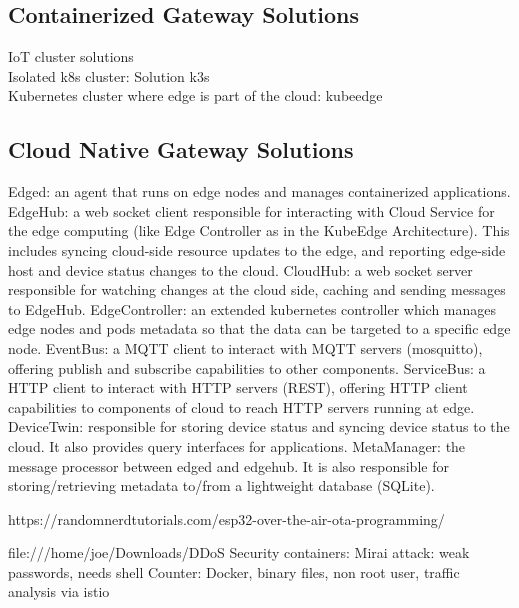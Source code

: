 \subsection{Containerized Gateway Solutions}

IoT cluster solutions\\
Isolated k8s cluster: Solution k3s\\
Kubernetes cluster where edge is part of the cloud: kubeedge\\



\subsection{Cloud Native Gateway Solutions}
Edged: an agent that runs on edge nodes and manages containerized applications.
EdgeHub: a web socket client responsible for interacting with Cloud Service for the edge computing (like Edge Controller as in the KubeEdge Architecture). This includes syncing cloud-side resource updates to the edge, and reporting edge-side host and device status changes to the cloud.
CloudHub: a web socket server responsible for watching changes at the cloud side, caching and sending messages to EdgeHub.
EdgeController: an extended kubernetes controller which manages edge nodes and pods metadata so that the data can be targeted to a specific edge node.
EventBus: a MQTT client to interact with MQTT servers (mosquitto), offering publish and subscribe capabilities to other components.
ServiceBus: a HTTP client to interact with HTTP servers (REST), offering HTTP client capabilities to components of cloud to reach HTTP servers running at edge.
DeviceTwin: responsible for storing device status and syncing device status to the cloud. It also provides query interfaces for applications.
MetaManager: the message processor between edged and edgehub. It is also responsible for storing/retrieving metadata to/from a lightweight database (SQLite).

https://randomnerdtutorials.com/esp32-over-the-air-ota-programming/

file:///home/joe/Downloads/DDoS%
Security containers:
Mirai attack: weak passwords, needs shell
Counter: Docker, binary files, non root user, 
traffic analysis via istio